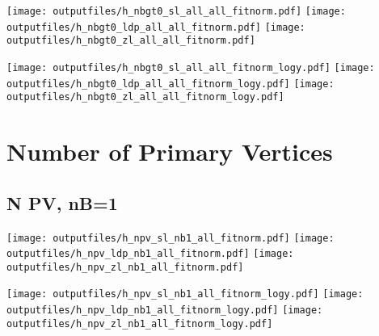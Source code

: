 \documentclass[11pt]{article}
\begin{document}
    \noindent
     \texttt{[image: outputfiles/h\_nbgt0\_sl\_all\_all\_fitnorm.pdf]}
     \texttt{[image: outputfiles/h\_nbgt0\_ldp\_all\_all\_fitnorm.pdf]}
     \texttt{[image: outputfiles/h\_nbgt0\_zl\_all\_all\_fitnorm.pdf]}

    \noindent
     \texttt{[image: outputfiles/h\_nbgt0\_sl\_all\_all\_fitnorm\_logy.pdf]}
     \texttt{[image: outputfiles/h\_nbgt0\_ldp\_all\_all\_fitnorm\_logy.pdf]}
     \texttt{[image: outputfiles/h\_nbgt0\_zl\_all\_all\_fitnorm\_logy.pdf]}







    \section{Number of Primary Vertices }

    \subsection{ N PV, nB=1 }

    \noindent
     \texttt{[image: outputfiles/h\_npv\_sl\_nb1\_all\_fitnorm.pdf]}
     \texttt{[image: outputfiles/h\_npv\_ldp\_nb1\_all\_fitnorm.pdf]}
     \texttt{[image: outputfiles/h\_npv\_zl\_nb1\_all\_fitnorm.pdf]}

    \noindent
     \texttt{[image: outputfiles/h\_npv\_sl\_nb1\_all\_fitnorm\_logy.pdf]}
     \texttt{[image: outputfiles/h\_npv\_ldp\_nb1\_all\_fitnorm\_logy.pdf]}
     \texttt{[image: outputfiles/h\_npv\_zl\_nb1\_all\_fitnorm\_logy.pdf]}





  
\end{document}
